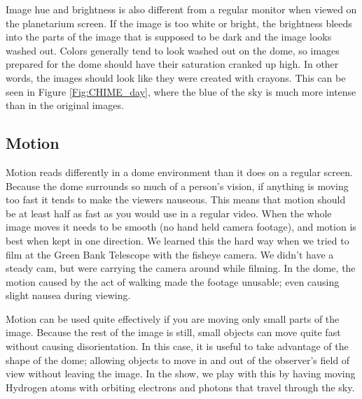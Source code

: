 Image hue and brightness is also different from a regular monitor when viewed on the planetarium screen. If the image is too white or bright, the brightness bleeds into the parts of the image that is supposed to be dark and the image looks washed out. Colors generally tend to look washed out on the dome, so images prepared for the dome should have their saturation cranked up high. In other words, the images should look like they were created with crayons. This can be seen in Figure \ref{Fig:CHIME_day}, where the blue of the sky is much more intense than in the original images. 


\subsection{Motion}

Motion reads differently in a dome environment than it does on a regular screen. Because the dome surrounds so much of a person's vision, if anything is moving too fast it tends to make the viewers nauseous. This means that motion should be at least half as fast as you would use in a regular video. When the whole image moves it needs to be smooth (no hand held camera footage), and motion is best when kept in one direction. We learned this the hard way when we tried to film at the Green Bank Telescope with the fisheye camera. We didn't have a steady cam, but were carrying the camera around while filming. In the dome, the motion caused by the act of walking made the footage unusable; even causing slight nausea during viewing.

Motion can be used quite effectively if you are moving only small parts of the image. Because the rest of the image is still, small objects can move quite fast without causing disorientation. In this case, it is useful to take advantage of the shape of the dome; allowing objects to move in and out of the observer's field of view without leaving the image. In the show, we play with this by having moving Hydrogen atoms with orbiting electrons and photons that travel through the sky. 

